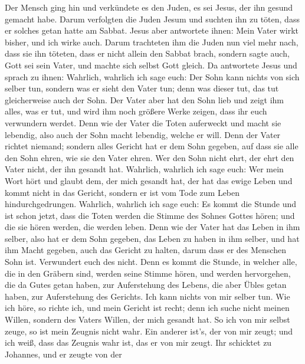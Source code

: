  Der Mensch ging hin und verkündete es den Juden, es sei
Jesus, der ihn gesund gemacht habe.  Darum verfolgten die
Juden Jesum und suchten ihn zu töten, dass er solches getan hatte am
Sabbat.  Jesus aber antwortete ihnen: Mein Vater wirkt
bisher, und ich wirke auch.  Darum trachteten ihm die
Juden nun viel mehr nach, dass sie ihn töteten, dass er nicht allein den
Sabbat brach, sondern sagte auch, Gott sei sein Vater, und machte sich
selbst Gott gleich.  Da antwortete Jesus und sprach zu
ihnen: Wahrlich, wahrlich ich sage euch: Der Sohn kann nichts von sich
selber tun, sondern was er sieht den Vater tun; denn was dieser tut, das
tut gleicherweise auch der Sohn.  Der Vater aber hat den
Sohn lieb und zeigt ihm alles, was er tut, und wird ihm noch größere
Werke zeigen, dass ihr euch verwundern werdet.  Denn wie
der Vater die Toten auferweckt und macht sie lebendig, also auch der
Sohn macht lebendig, welche er will.  Denn der Vater
richtet niemand; sondern alles Gericht hat er dem Sohn gegeben,
 auf dass sie alle den Sohn ehren, wie sie den Vater
ehren. Wer den Sohn nicht ehrt, der ehrt den Vater nicht, der ihn
gesandt hat.  Wahrlich, wahrlich ich sage euch: Wer mein
Wort hört und glaubt dem, der mich gesandt hat, der hat das ewige Leben
und kommt nicht in das Gericht, sondern er ist vom Tode zum Leben
hindurchgedrungen.  Wahrlich, wahrlich ich sage euch: Es
kommt die Stunde und ist schon jetzt, dass die Toten werden die Stimme
des Sohnes Gottes hören; und die sie hören werden, die werden leben.
 Denn wie der Vater hat das Leben in ihm selber, also hat
er dem Sohn gegeben, das Leben zu haben in ihm selber, 
und hat ihm Macht gegeben, auch das Gericht zu halten, darum dass er des
Menschen Sohn ist.  Verwundert euch des nicht. Denn es
kommt die Stunde, in welcher alle, die in den Gräbern sind, werden seine
Stimme hören,  und werden hervorgehen, die da Gutes getan
haben, zur Auferstehung des Lebens, die aber Übles getan haben, zur
Auferstehung des Gerichts.  Ich kann nichts von mir
selber tun. Wie ich höre, so richte ich, und mein Gericht ist recht;
denn ich suche nicht meinen Willen, sondern des Vaters Willen, der mich
gesandt hat.  So ich von mir selbst zeuge, so ist mein
Zeugnis nicht wahr.  Ein anderer ist's, der von mir
zeugt; und ich weiß, dass das Zeugnis wahr ist, das er von mir zeugt.
 Ihr schicktet zu Johannes, und er zeugte von der
